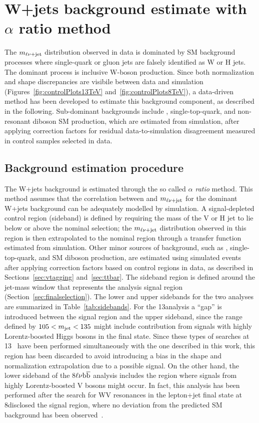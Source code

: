 \section{W+jets background estimate with $\alpha$ ratio method}\label{sec:alpha}

The $m_{\ell\nu+{\rm jet}}$ distribution observed in data is dominated by SM background processes where
single-quark or gluon jets are falsely identified as W or H jets. The dominant process is inclusive W-boson production. 
Since both normalization and shape discrepancies are visibile between data and simulation (Figures~\ref{fig:controlPlots13TeV} and~\ref{fig:controlPlots8TeV}),
a data-driven method has been developed to estimate this background component, as described in the following.
Sub-dominant backgrounds include \ttbar, single-top-quark, and non-resonant diboson SM production,
which are estimated from simulation, after applying correction factors for residual data-to-simulation disagreement measured in control samples selected in data.

\subsection{Background estimation procedure}

The W+jets background is estimated through the so called \textit{$\alpha$ ratio} method.
This method assumes that the correlation between \mJ and $m_{\ell\nu+{\rm jet}}$ for the dominant W+jets background can be adequately modelled by simulation.
A signal-depleted control region (sideband) is defined by requiring the mass of the V or H jet to lie below or above the nominal selection; the
$m_{\ell\nu+{\rm jet}}$ distribution observed in this region is then extrapolated to the nominal region through
a transfer function estimated from simulation. Other minor sources of background, such as
\ttbar, single-top-quark, and SM diboson production, are estimated using simulated events after
applying correction factors based on control regions in data, as described in Sections~\ref{sec:vtagging} and~\ref{sec:ttbar}.
The sideband region is defined around the jet-mass window that represents the analysis signal region (Section~\ref{sec:finalselection}).
The lower and upper sidebands for the two analyses are summarized in Table~\ref{tab:sidebands}.
For the 13\TeV analysis a ``gap'' is introduced between the signal region and the upper sideband, since the
range defined by $105 < m_{\text{jet}} < 135$ might include contribution from signals with highly Lorentz-boosted Higgs bosons in the final state.
Since these types of searches at 13\TeV~\cite{Khachatryan:2016cfx} have been performed simultaneously with the one described in this work,
this region has been discarded to avoid introducing a bias in the shape and normalization extrapolation due to a possible signal.
On the other hand, the lower sideband of the 8\TeV $\ell\nu{\mathrm{b}\overline{\mathrm{b}}}$ analysis includes the region where signals from highly Lorentz-boosted V bosons might occur.
In fact, this analysis has been performed after the search for WV resonances in the lepton+jet final state at 8\TeV disclosed the signal region,
where no deviation from the predicted SM background has been observed~\cite{Khachatryan:2014gha}.

